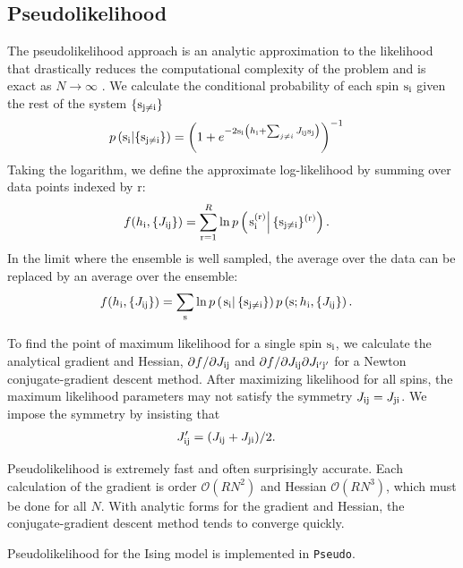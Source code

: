 \documentclass[aps,prl,twocolumn,nofootinbib]{revtex4-1}
\begin{document}
\subsection{Pseudolikelihood}
The pseudolikelihood approach is an analytic approximation to the likelihood that drastically reduces the computational complexity of the problem and is exact as $N \rightarrow \infty$ \cite{Aurell:2012hi}. We calculate the conditional probability of each spin ${\rm s}_{\rm i}$ given the rest of the system $\{{\rm s}_{\rm j\neq i}\}$
\begin{align}
	p\left({\rm s}_{\rm i}|\{{\rm s}_{\rm j\neq i}\}\right) &= \left( 1+e^{-2{\rm s}_{\rm i} \left(h_{\rm i}+\sum_{j\neq i}J_{\rm ij}{\rm s}_{\rm j}\right)} \right)^{-1}
\end{align}
Taking the logarithm, we define the approximate log-likelihood by summing over data points indexed by r:
\begin{align}
	f(h_{\rm i},\{J_{\rm ij}\}) &= \sum_{\rm r=1}^R \ln p\left(\left.{\rm s}_{\rm i}^{(\rm r)}\right|\{{\rm s}_{\rm j\neq i}\}^{(\rm r)}\right).
\end{align}
In the limit where the ensemble is well sampled, the average over the data can be replaced by an average over the ensemble:
\begin{align}
	f(h_{\rm i},\{J_{\rm ij}\}) &= \sum_{\rm s} \ln p\left(\left.{\rm s}_{\rm i}\right|\{{\rm s}_{\rm j\neq i}\}\right)p\left({\rm s};h_{\rm i},\{J_{\rm ij}\}\right).
\end{align}

To find the point of maximum likelihood for a single spin ${\rm s}_{\rm i}$, we calculate the analytical gradient and Hessian, $\partial f/\partial J_{\rm ij}$ and $\partial f/\partial J_{\rm ij}\partial J_{\rm i'j'}$ for a Newton conjugate-gradient descent method. After maximizing likelihood for all spins, the maximum likelihood parameters may not satisfy the symmetry $J_{\rm ij}=J_{\rm ji}$. We impose the symmetry by insisting that
\begin{align}
	J_{\rm ij}' &= (J_{\rm ij}+J_{\rm ji})/2.
\end{align}

Pseudolikelihood is extremely fast and often surprisingly accurate. Each calculation of the gradient is order $\mathcal{O}(RN^2)$ and Hessian $\mathcal{O}(RN^3)$, which must be done for all $N$. With analytic forms for the gradient and Hessian, the conjugate-gradient descent method tends to converge quickly.

Pseudolikelihood for the Ising model is implemented in {\tt Pseudo}.
\end{document}
